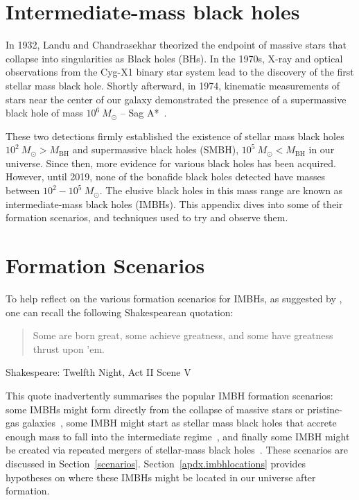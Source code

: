 \section{Intermediate-mass black holes}

In 1932, Landu and Chandrasekhar theorized the endpoint of massive
stars that collapse into singularities as Black holes (BHs). 
In the 1970s, X-ray and optical observations from the Cyg-X1 binary star system lead to the discovery of the first stellar mass black hole. 
Shortly afterward, in 1974, kinematic measurements of stars near the center of our galaxy demonstrated the presence of a supermassive black hole of mass $10^6\ M_{\odot}$ -- Sag A*~\cite{sagA}.

These two detections firmly established the existence of stellar mass black holes $10^{2} \ M_{\odot} > M_\text{BH}$ and supermassive black holes (SMBH), $10^{5} \ M_{\odot} < M_\text{BH}$ in our universe. 
Since then, more evidence for various black holes has been acquired. 
However, until 2019, none of the bonafide black holes detected have masses between $10^{2} - 10^{5}\ M_{\odot}$. 
The elusive black holes in this mass range are known as intermediate-mass black holes (IMBHs).
This appendix dives into some of their formation scenarios, and techniques used to try and observe them.  


\section{Formation Scenarios}

To help reflect on the various formation scenarios for IMBHs,  
as suggested by \citet{miller2003formation},
one can recall the following Shakespearean quotation:

\blockquote{Some are born great, some achieve greatness, and some have greatness thrust upon 'em. }{Shakespeare:  Twelfth Night, Act II Scene V}

This quote inadvertently summarises the popular IMBH formation scenarios: some IMBHs might form directly from the collapse of massive stars or pristine-gas galaxies~\cite{lodato2006supermassive}, some IMBH might start as stellar mass black holes that accrete enough mass to fall into the intermediate regime~\cite{coleman2002production}, and finally some IMBH might be created via repeated mergers of stellar-mass black holes~\cite{2018IMBHreview}. 
These scenarios are discussed in Section~\ref{scenarios}. 
Section~\ref{apdx.imbhlocations} provides hypotheses on where these IMBHs might be located in our universe after formation.

